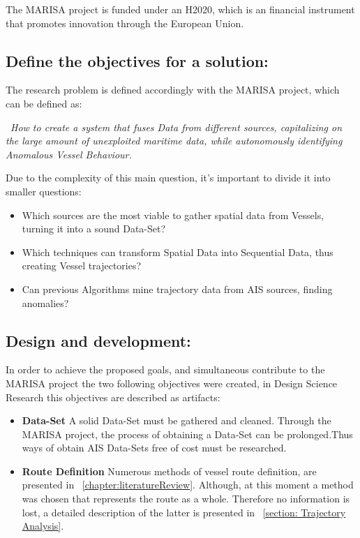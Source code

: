 The MARISA project is funded under an H2020, which is an financial instrument that promotes innovation through the European Union.

\subsection{Define the objectives for a solution:}
The research problem is defined accordingly with the MARISA project, which can be defined as: 

~\textit{How to create a system that fuses Data from different sources, capitalizing on the large amount of unexploited maritime data, while autonomously identifying Anomalous Vessel Behaviour.}  

Due to the complexity of this main question, it's important to divide it into smaller questions:

\begin{itemize}
\item Which sources are the most viable to gather spatial data from Vessels,
turning it into a sound Data-Set?
\item Which techniques can transform Spatial Data into Sequential Data, thus creating Vessel trajectories?
\item Can previous Algorithms mine trajectory data from AIS sources, finding anomalies?
\end{itemize}

\subsection{Design and development:} In order to achieve the proposed goals, and simultaneous contribute to the MARISA project the two following objectives were created, in Design Science Research this objectives are described as artifacts:

\begin{itemize}
\item \textbf{Data-Set} A solid Data-Set must be gathered and cleaned. Through the MARISA project, the process of obtaining a Data-Set can be prolonged.Thus ways of obtain AIS Data-Sets free of cost must be researched.

\item \textbf{Route Definition} Numerous methods of vessel route definition, are presented in ~\ref{chapter:literatureReview}.
Although, at this moment a method was chosen that represents the route as a whole. Therefore no information is lost, a detailed description of the latter is presented in ~\ref{section: Trajectory Analysis}.
\end{itemize}

